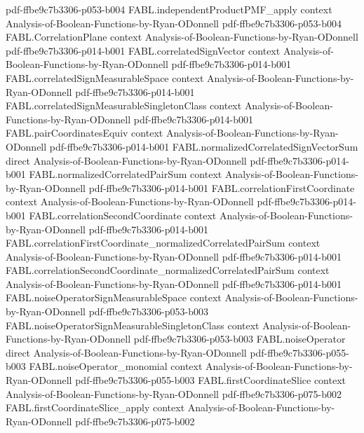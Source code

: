 \begin{theorem}
  {pdf-ffbe9c7b3306-p053-b004}
\proofstep
  {FABL.independentProductPMF_apply}
  {context}
  {Analysis-of-Boolean-Functions-by-Ryan-ODonnell}
  {pdf-ffbe9c7b3306-p053-b004}
\proofstep
  {FABL.CorrelationPlane}
  {context}
  {Analysis-of-Boolean-Functions-by-Ryan-ODonnell}
  {pdf-ffbe9c7b3306-p014-b001}
\proofstep
  {FABL.correlatedSignVector}
  {context}
  {Analysis-of-Boolean-Functions-by-Ryan-ODonnell}
  {pdf-ffbe9c7b3306-p014-b001}
\proofstep
  {FABL.correlatedSignMeasurableSpace}
  {context}
  {Analysis-of-Boolean-Functions-by-Ryan-ODonnell}
  {pdf-ffbe9c7b3306-p014-b001}
\proofstep
  {FABL.correlatedSignMeasurableSingletonClass}
  {context}
  {Analysis-of-Boolean-Functions-by-Ryan-ODonnell}
  {pdf-ffbe9c7b3306-p014-b001}
\proofstep
  {FABL.pairCoordinatesEquiv}
  {context}
  {Analysis-of-Boolean-Functions-by-Ryan-ODonnell}
  {pdf-ffbe9c7b3306-p014-b001}
\proofstep
  {FABL.normalizedCorrelatedSignVectorSum}
  {direct}
  {Analysis-of-Boolean-Functions-by-Ryan-ODonnell}
  {pdf-ffbe9c7b3306-p014-b001}
\proofstep
  {FABL.normalizedCorrelatedPairSum}
  {context}
  {Analysis-of-Boolean-Functions-by-Ryan-ODonnell}
  {pdf-ffbe9c7b3306-p014-b001}
\proofstep
  {FABL.correlationFirstCoordinate}
  {context}
  {Analysis-of-Boolean-Functions-by-Ryan-ODonnell}
  {pdf-ffbe9c7b3306-p014-b001}
\proofstep
  {FABL.correlationSecondCoordinate}
  {context}
  {Analysis-of-Boolean-Functions-by-Ryan-ODonnell}
  {pdf-ffbe9c7b3306-p014-b001}
\proofstep
  {FABL.correlationFirstCoordinate_normalizedCorrelatedPairSum}
  {context}
  {Analysis-of-Boolean-Functions-by-Ryan-ODonnell}
  {pdf-ffbe9c7b3306-p014-b001}
\proofstep
  {FABL.correlationSecondCoordinate_normalizedCorrelatedPairSum}
  {context}
  {Analysis-of-Boolean-Functions-by-Ryan-ODonnell}
  {pdf-ffbe9c7b3306-p014-b001}
\proofstep
  {FABL.noiseOperatorSignMeasurableSpace}
  {context}
  {Analysis-of-Boolean-Functions-by-Ryan-ODonnell}
  {pdf-ffbe9c7b3306-p053-b003}
\proofstep
  {FABL.noiseOperatorSignMeasurableSingletonClass}
  {context}
  {Analysis-of-Boolean-Functions-by-Ryan-ODonnell}
  {pdf-ffbe9c7b3306-p053-b003}
\proofstep
  {FABL.noiseOperator}
  {direct}
  {Analysis-of-Boolean-Functions-by-Ryan-ODonnell}
  {pdf-ffbe9c7b3306-p055-b003}
\proofstep
  {FABL.noiseOperator_monomial}
  {context}
  {Analysis-of-Boolean-Functions-by-Ryan-ODonnell}
  {pdf-ffbe9c7b3306-p055-b003}
\proofstep
  {FABL.firstCoordinateSlice}
  {context}
  {Analysis-of-Boolean-Functions-by-Ryan-ODonnell}
  {pdf-ffbe9c7b3306-p075-b002}
\proofstep
  {FABL.firstCoordinateSlice_apply}
  {context}
  {Analysis-of-Boolean-Functions-by-Ryan-ODonnell}
  {pdf-ffbe9c7b3306-p075-b002}

\end{theorem}
